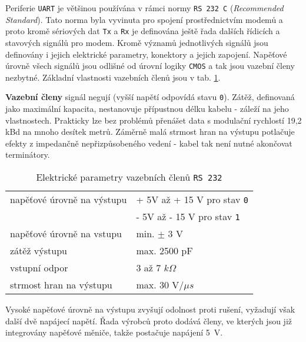         Periferie \texttt{UART} je většinou používána v rámci normy \texttt{RS 232 C} 
        (\emph{Recommended Standard}). Tato norma byla vyvinuta pro spojení prostřednictvím modemů 
        a proto kromě sériových dat \texttt{Tx} a \texttt{Rx} je definována ještě řada dalších 
        řídicích a stavových signálů pro modem. Kromě významů jednotlivých signálů jsou definovány 
        i jejich elektrické parametry, konektory a jejich zapojení. Napěťové úrovně všech signálů 
        jsou odlišné od úrovní logiky \texttt{CMOS} a tak jsou vazební členy nezbytné. Základní 
        vlastnosti vazebních členů jsou v tab. \ref{MIT:tab_UARTparam}.
        
        \textbf{Vazební členy} signál negují (vyšší napětí odpovídá stavu \texttt{0}). Zátěž, 
        definovaná jako maximální kapacita, nestanovuje přípustnou délku kabelu - záleží na jeho 
        vlastnostech. Prakticky lze bez problémů přenášet data s modulační rychlostí 19,2 kBd na 
        mnoho desítek metrů. Záměrně malá strmost hran na výstupu potlačuje efekty z impedančně 
        nepřizpůsobeného vedení - kabel tak není nutné akončovat terminátory.
        
        \begin{table}[ht!]
          \centering
          \begin{tabular*}{0.75\textwidth}{l|l}
          \cline{1-2}
            napěťové úrovně na výstupu & + 5V až + 15 V pro stav \texttt{0}      \\ 
                                       & - 5V až - 15 V pro stav \texttt{1}      \\ \cline{1-2}
            napěťové úrovně na vstupu  & min. \(\pm\) 3 V                        \\ \cline{1-2}
            zátěž výstupu              & max. 2500 pF                            \\ \cline{1-2}
            vstupní odpor              & 3 až 7 \(k\Omega\)                      \\ \cline{1-2}
            strmost hran na výstupu    & max. 30 V/\(\mu s\)                     \\ \cline{1-2}
          \end{tabular*}
          \caption{Elektrické parametry vazebních členů \texttt{RS 232}}
          \label{MIT:tab_UARTparam}
        \end{table}
                  
        Vysoké napěťové úrovně na výstupu zvyšují odolnost proti rušení, vyžadují však další dvě 
        napájecí napětí. Řada výrobců proto dodává členy, ve kterých jsou již integrovány napěťové 
        měniče, takže postačuje napájení \SI{5}{\volt}.
        
